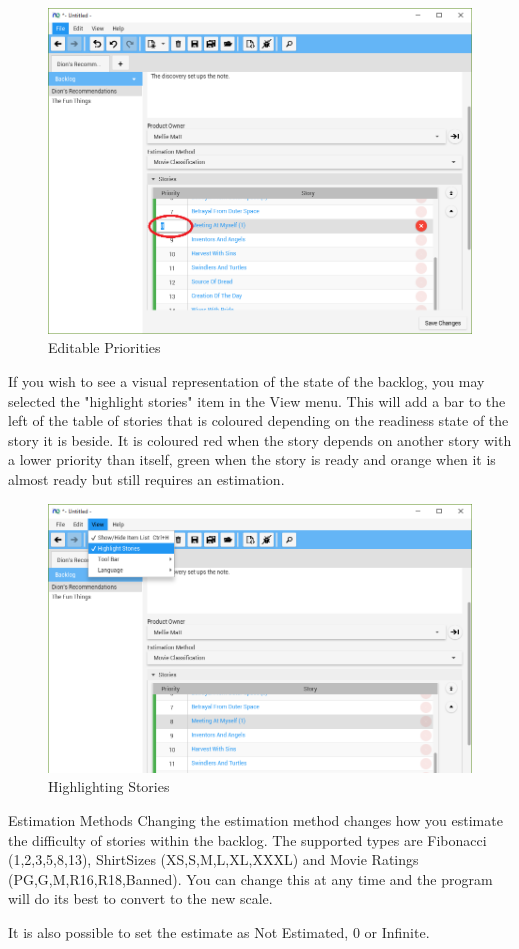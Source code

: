 \begin{figure}[H]
\centering
\includegraphics[width=\textwidth]{images/screenshots/editable_priority.PNG}
\caption{Editable Priorities}
\label{fig:new_project}
\end{figure}

\bigskip
If you wish to see a visual representation of the state of the backlog, you may selected the "highlight stories" item in the View menu. This will add a bar to the left of the table of stories that is coloured depending on the readiness state of the story it is beside. It is coloured red when the story depends on another story with a lower priority than itself, green when the story is ready and orange when it is almost ready but still requires an estimation.

\begin{figure}[H]
\centering
\includegraphics[width=\textwidth]{images/screenshots/story_highlighting.PNG}
\caption{Highlighting Stories}
\label{fig:new_project}
\end{figure}

\bigskip
Estimation Methods
\newline
Changing the estimation method changes how you estimate the difficulty of stories within the backlog. The supported types are Fibonacci (1,2,3,5,8,13), ShirtSizes (XS,S,M,L,XL,XXXL) and Movie Ratings (PG,G,M,R16,R18,Banned). You can change this at any time and the program will do its best to convert to the new scale. 

It is also possible to set the estimate as Not Estimated, 0 or Infinite.